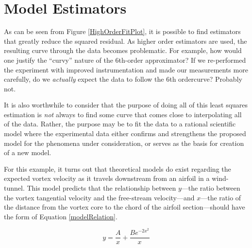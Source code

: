 \section{Model Estimators}

As can be seen from Figure \ref{HighOrderFitPlot}, it is possible to find estimators that greatly reduce the squared residual.  As higher order estimators are used, the resulting curve through the data becomes problematic.  For example, how would one justify the ``curvy'' nature of the 6th-order approximator?  If we re-performed the experiment with improved instrumentation and made our measurements more carefully, do we \emph{actually} expect the data to follow the 6th ordercurve?  Probably not.  

It is also worthwhile to consider that the purpose of doing all of this least squares estimation is \emph{not} always to find some curve that comes close to interpolating all of the data.  Rather, the purpose may be to fit the data to a rational scientific model where the experimental data either confirms and strengthens the proposed model for the phenomena under consideration, or serves as the basis for creation of a new model.\cite{trefethen2}

For this example, it turns out that theoretical models do exist regarding the expected vortex velocity as it travels downstream from an airfoil in a wind-tunnel.  This model predicts that the relationship between $y$---the ratio between the vortex tangential velocity and the free-stream velocity---and $x$---the ratio of the distance from the vortex core to the chord of the airfoil section---should have the form of Equation \ref{modelRelation}.

\begin{equation}
y = \frac{A}{x} + \frac{B e^{-2 x^{2}}}{x}
\label{modelRelation}
\end{equation}

